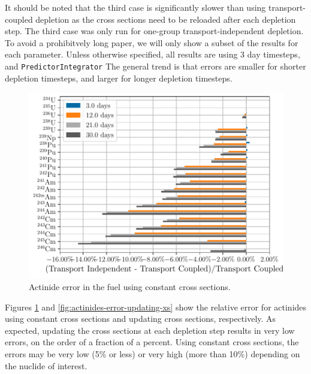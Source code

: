     It should be noted that the third case is significantly slower than using
    transport-coupled depletion as the cross sections need to be reloaded after
    each depletion step. The third case was only run for one-group
    transport-independent depletion. To avoid a prohibitvely long paper, we will
    only show a subset of the results for each parameter. Unless otherwise
    specified, all results are using 3 day timesteps, and
    \verb.PredictorIntegrator.  The general trend is that errors are smaller for
    shorter depletion timesteps, and larger for longer depletion timesteps.



    \begin{figure}[h!tpb]
        \centering
        \includegraphics[width=\linewidth]{figs/actinides_constant_xs_predictor_fission_q_days.pdf}
        \caption[]{Actinide error in the fuel using constant cross sections.}
        \label{fig:actinides-error-constant-xs}
    \end{figure}
    Figures \ref{fig:actinides-error-constant-xs} and
    \ref{fig:actinides-error-updating-xs} show the relative error for actinides
    using constant cross sections and updating cross sections, respectively.  As
    expected, updating the cross sections at each depletion step results in very
    low errors, on the order of a fraction of a percent.  Using constant cross
    sections, the errors may be very low (5\% or less) or very high (more than
    10\%) depending on the nuclide of interest.
